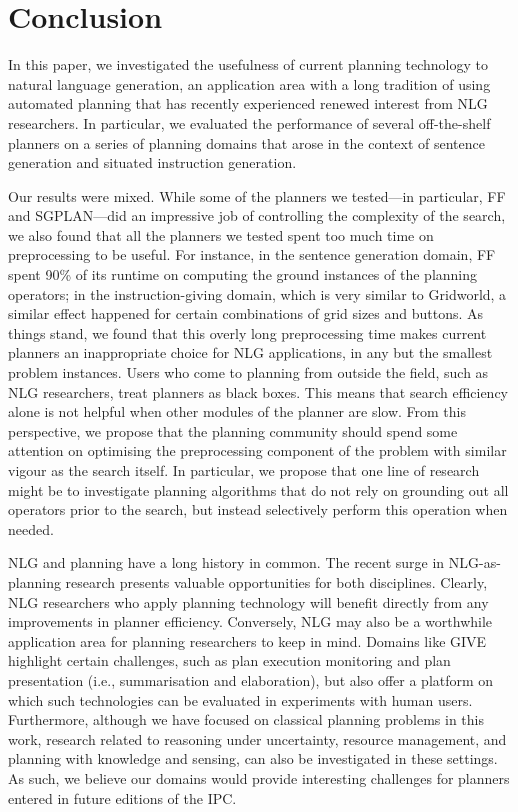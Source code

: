 \section{Conclusion}
\label{sec:conclusion}

In this paper, we investigated the usefulness of current planning technology
to natural language generation, an application area with a long tradition of
using automated planning that has recently experienced renewed interest from
NLG researchers. In particular, we evaluated the performance of several
off-the-shelf planners on a series of planning domains that arose in the
context of sentence generation and situated instruction generation.

Our results were mixed. While some of the planners we tested---in
particular, FF and SGPLAN---did an impressive job of controlling the
complexity of the search, we also found that all the planners we tested
spent too much time on preprocessing to be useful. For instance, in the
sentence generation domain, FF spent 90\% of its runtime on computing the
ground instances of the planning operators; in the instruction-giving
domain, which is very similar to Gridworld, a similar effect happened for
certain combinations of grid sizes and buttons. As things stand, we found
that this overly long preprocessing time makes current planners an
inappropriate choice for NLG applications, in any but the smallest problem
instances. Users who come to planning from outside the field, such as NLG
researchers, treat planners as black boxes. This means that search
efficiency alone is not helpful when other modules of the planner are slow.
From this perspective, we propose that the planning community should spend
some attention on optimising the preprocessing component of the problem with
similar vigour as the search itself. In particular, we propose that one line
of research might be to investigate planning algorithms that do not rely on
grounding out all operators prior to the search, but instead selectively
perform this operation when needed.

NLG and planning have a long history in common. The recent surge in
NLG-as-planning research presents valuable opportunities for both
disciplines. Clearly, NLG researchers who apply planning technology will
benefit directly from any improvements in planner efficiency. Conversely, NLG
may also be a worthwhile application area for planning researchers to keep
in mind. Domains like GIVE highlight certain challenges, such as plan
execution monitoring and plan presentation (i.e., summarisation and
elaboration), but also offer a platform on which such technologies can be
evaluated in experiments with human users. Furthermore, although we have
focused on classical planning problems in this work, research related to
reasoning under uncertainty, resource management, and planning with
knowledge and sensing, can also be investigated in these settings. As such,
we believe our domains would provide interesting challenges for planners
entered in future editions of the IPC.



